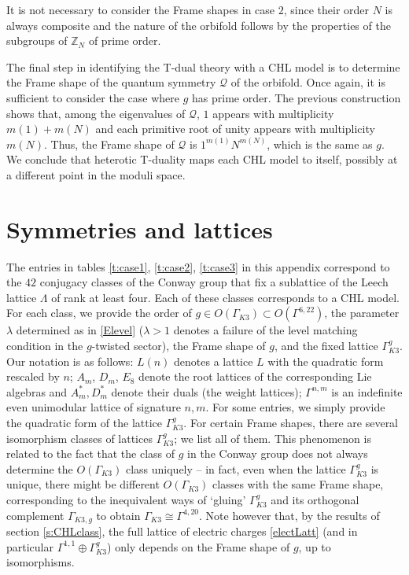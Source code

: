 \documentclass[a4paper,11pt]{article}
\newcommand{\ZZ}{\mathbb{Z}}
\newcommand{\Q}{\mathcal{Q}}
\numberwithin{equation}{section}
\begin{document}
\medskip

It is not necessary to consider the Frame shapes in case $2$, since their order $N$ is always composite and the nature of the orbifold follows by the properties of the subgroups of $\ZZ_N$ of prime order. 

\medskip

The final step in identifying the T-dual theory with a CHL model is to determine the Frame shape of the quantum symmetry $\Q$ of the orbifold. Once again, it is sufficient to consider the case where $g$ has prime order. The previous construction shows that, among the eigenvalues of $\Q$,   $1$ appears with multiplicity $m(1)+m(N)$ and each primitive root of unity appears with multiplicity $
m(N)$. Thus, the Frame shape of $\Q$ is $1^{m(1)}N^{m(N)}$, which is the same as $g$. We conclude that heterotic T-duality maps each CHL model to itself, possibly at a different point in the moduli space.

\section{Symmetries and lattices}
\label{s:lattices}

The entries in tables \ref{t:case1}, \ref{t:case2}, \ref{t:case3} in this appendix correspond to the $42$ conjugacy classes of the Conway group that fix a sublattice of the Leech lattice $\Lambda$ of rank at least four. Each of these classes corresponds to a CHL model. For each class, we provide the order of $g\in O(\Gamma_{K3})\subset O(\Gamma^{6,22})$, the parameter $\lambda$ determined as in \eqref{Elevel} ($\lambda>1$ denotes a failure of the level matching condition in the $g$-twisted sector), the Frame shape of $g$, and the fixed lattice $\Gamma_{K3}^g$. Our notation is as follows:  $L(n)$ denotes a lattice $L$ with the quadratic form rescaled by $n$;  $A_m$, $D_m$, $E_8$ denote the root lattices of the corresponding Lie algebras and $A_m^*,D_m^*$ denote their duals (the weight lattices); $\Gamma^{n,m}$ is an indefinite even unimodular lattice of signature $n,m$. For some entries, we simply provide the quadratic form of the lattice $\Gamma_{K3}^g$. For certain Frame shapes, there are several isomorphism classes of lattices $\Gamma_{K3}^g$; we list all of them. This phenomenon is related to the fact that the class of $g$ in the Conway group does not always determine the $O(\Gamma_{K3})$ class uniquely -- in fact, even when the lattice $\Gamma_{K3}^g$ is unique, there might be different $O(\Gamma_{K3})$ classes with the same Frame shape, corresponding to the inequivalent ways of `gluing' $\Gamma_{K3}^g$ and its orthogonal complement $\Gamma_{K3,g}$ to obtain $\Gamma_{K3}\cong \Gamma^{4,20}$. Note however that, by the results of section \ref{s:CHLclass}, the full lattice of electric charges \eqref{electLatt} (and in particular $\Gamma^{1,1}\oplus \Gamma_{K3}^g$) only depends on the Frame shape of $g$, up to isomorphisms.
\end{document}
